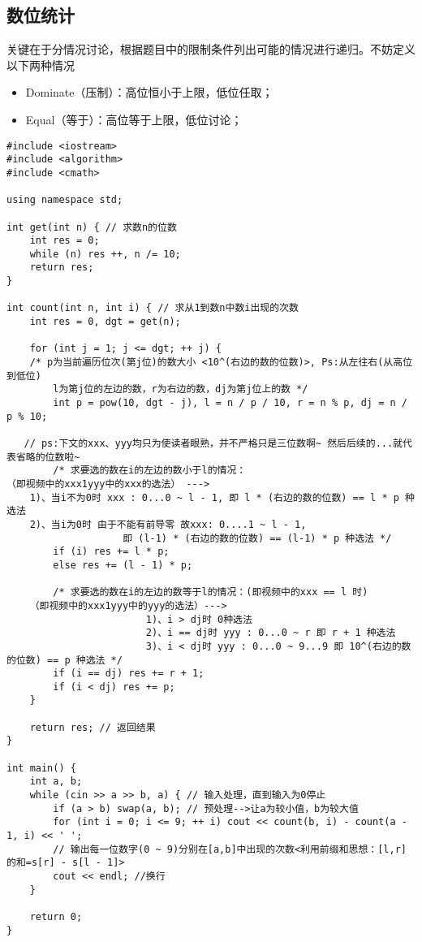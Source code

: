 \documentclass[12pt,a4paper,UTF16]{ctexbook}
\theoremstyle{plain}
\begin{document}
\subsection{数位统计}
关键在于分情况讨论，根据题目中的限制条件列出可能的情况进行递归。不妨定义以下两种情况
\begin{itemize}
    \item Dominate（压制）：高位恒小于上限，低位任取；
    \item Equal（等于）：高位等于上限，低位讨论；
\end{itemize}
\begin{lstlisting}
#include <iostream>
#include <algorithm>
#include <cmath>

using namespace std;

int get(int n) { // 求数n的位数
    int res = 0;
    while (n) res ++, n /= 10;
    return res;
}

int count(int n, int i) { // 求从1到数n中数i出现的次数
    int res = 0, dgt = get(n);

    for (int j = 1; j <= dgt; ++ j) {
    /* p为当前遍历位次(第j位)的数大小 <10^(右边的数的位数)>, Ps:从左往右(从高位到低位)
        l为第j位的左边的数，r为右边的数，dj为第j位上的数 */
        int p = pow(10, dgt - j), l = n / p / 10, r = n % p, dj = n / p % 10;

   // ps:下文的xxx、yyy均只为使读者眼熟，并不严格只是三位数啊~ 然后后续的...就代表省略的位数啦~
        /* 求要选的数在i的左边的数小于l的情况：
（即视频中的xxx1yyy中的xxx的选法） --->
    1)、当i不为0时 xxx : 0...0 ~ l - 1, 即 l * (右边的数的位数) == l * p 种选法
    2)、当i为0时 由于不能有前导零 故xxx: 0....1 ~ l - 1, 
                    即 (l-1) * (右边的数的位数) == (l-1) * p 种选法 */
        if (i) res += l * p;
        else res += (l - 1) * p;

        /* 求要选的数在i的左边的数等于l的情况：(即视频中的xxx == l 时)
    （即视频中的xxx1yyy中的yyy的选法）--->
                        1)、i > dj时 0种选法
                        2)、i == dj时 yyy : 0...0 ~ r 即 r + 1 种选法
                        3)、i < dj时 yyy : 0...0 ~ 9...9 即 10^(右边的数的位数) == p 种选法 */
        if (i == dj) res += r + 1;
        if (i < dj) res += p;
    }

    return res; // 返回结果
}

int main() {
    int a, b;
    while (cin >> a >> b, a) { // 输入处理，直到输入为0停止
        if (a > b) swap(a, b); // 预处理-->让a为较小值，b为较大值
        for (int i = 0; i <= 9; ++ i) cout << count(b, i) - count(a - 1, i) << ' '; 
        // 输出每一位数字(0 ~ 9)分别在[a,b]中出现的次数<利用前缀和思想：[l,r]的和=s[r] - s[l - 1]>
        cout << endl; //换行
    }

    return 0; 
}
\end{lstlisting}
\end{document}
